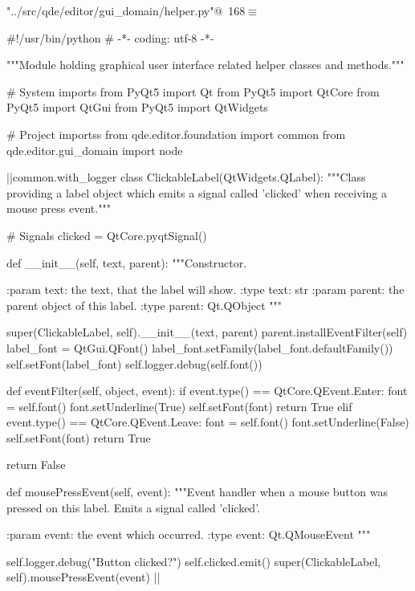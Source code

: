 \documentclass[%
    a4paper,    %
    justified,  %
    nobib,      %
    openany     %
]{tufte-book}
\begin{document}
\begin{flushleft} \small
\begin{minipage}{\linewidth}\label{scrap203}\raggedright\small
{} \verb@"../src/qde/editor/gui_domain/helper.py"@\nobreak\ {\footnotesize {168}}$\equiv$
\vspace{-1ex}
\begin{pythoncode}
#!/usr/bin/python
# -*- coding: utf-8 -*-

"""Module holding graphical user interface related helper classes and
methods."""

# System imports
from PyQt5 import Qt
from PyQt5 import QtCore
from PyQt5 import QtGui
from PyQt5 import QtWidgets

# Project importss
from qde.editor.foundation import common
from qde.editor.gui_domain import node


|\normalfont{}\fontfamily{}|common.with_logger
class ClickableLabel(QtWidgets.QLabel):
    """Class providing a label object which emits a signal called 'clicked'
    when receiving a mouse press event."""

    # Signals
    clicked = QtCore.pyqtSignal()

    def __init__(self, text, parent):
        """Constructor.

        :param text: the text, that the label will show.
        :type text: str
        :param parent: the parent object of this label.
        :type parent: Qt.QObject
        """

        super(ClickableLabel, self).__init__(text, parent)
        parent.installEventFilter(self)
        label_font = QtGui.QFont()
        label_font.setFamily(label_font.defaultFamily())
        self.setFont(label_font)
        self.logger.debug(self.font())

    def eventFilter(self, object, event):
        if event.type() == QtCore.QEvent.Enter:
            font = self.font()
            font.setUnderline(True)
            self.setFont(font)
            return True
        elif event.type() == QtCore.QEvent.Leave:
            font = self.font()
            font.setUnderline(False)
            self.setFont(font)
            return True

        return False

    def mousePressEvent(self, event):
        """Event handler when a mouse button was pressed on this label. Emits a
        signal called 'clicked'.

        :param event: the event which occurred.
        :type event: Qt.QMouseEvent
        """

        self.logger.debug("Button clicked?")
        self.clicked.emit()
        super(ClickableLabel, self).mousePressEvent(event)
|\NWsep|
\end{pythoncode}
\vspace{1.5ex}
\footnotesize
\begin{list}{}{\setlength{\itemsep}{-\parsep}\setlength{\itemindent}{-\leftmargin}}

\item{}
\end{list}
\end{minipage}\vspace{4ex}
\end{flushleft}
\end{document}
